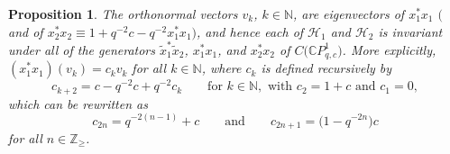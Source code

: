 \documentclass[11pt]{article}
\numberwithin{equation}{section}
\newtheorem{proposition}{Proposition}
\begin{document}
\begin{proposition}\label{recursive} The orthonormal vectors $v_{k}$, $k\in\mathbb{N}$, are
eigenvectors of $x_{1}^{\ast}x_{1}$ $($and of $x_{2}^{\ast}x_{2}\equiv
1+q^{-2}c-q^{-2}x_{1}^{\ast}x_{1})$, and hence each of $\mathcal{H}_{1}$ and
$\mathcal{H}_{2}$ is invariant under all of the generators $\tilde{x}
_{1}^{\ast}\tilde{x}_{2}$, $x_{1}^{\ast}x_{1}$, and $x_{2}^{\ast}x_{2}$ of
$C\big(\mathbb{C}P_{q,c}^{1}\big) $. More explicitly, $(x_{1}^{\ast}x_{1}) ( v_{k}) =c_{k}v_{k}$ for all
$k\in\mathbb{N}$, where $c_{k}$ is defined recursively by
\[
c_{k+2}=c-q^{-2}c+q^{-2}c_{k}\qquad \text{for }k\in\mathbb{N},\text{\ with\ } c_{2}=1+c\text{\ and }c_{1}=0,
\]
which can be rewritten as
\[
c_{2n}=q^{-2( n-1) }+c\qquad \text{and} \qquad c_{2n+1}=\big(1-q^{-2n}\big) c
\]
for all $n\in\mathbb{Z}_{\geq}$.
\end{proposition}
\end{document}
